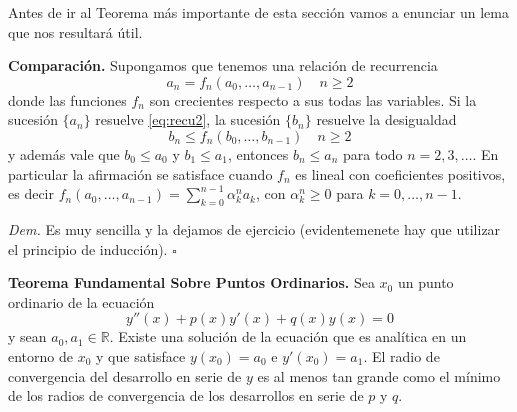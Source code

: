 \documentclass{article}
\newenvironment{demo}{\noindent\emph{Dem.}}{$\square$ \newline\vspace{5pt}}
\begin{document}
Antes de ir al Teorema más importante de esta sección vamos a enunciar un  lema que nos resultará útil.

\begin{lema}\label{lema:comp_recu}\textbf{Comparación.} Supongamos que tenemos una relación de recurrencia 
 \begin{equation}\label{eq:recu2} a_{n}=f_n(a_0,\ldots,a_{n-1})\quad n\geq 2\end{equation}
donde las funciones $f_n$ son crecientes respecto a sus todas las variables. Si la sucesión  $\{a_n\}$ resuelve \eqref{eq:recu2}, la sucesión  $\{b_n\}$ resuelve la desigualdad
 \[b_{n}\leq f_n(b_0,\ldots,b_{n-1})\quad n\geq 2 \]
y además vale que  $b_0\leq a_0$ y $b_1\leq a_1$, entonces $b_n\leq a_n$ para todo $n=2,3,\ldots$. En particular la afirmación se satisface cuando $f_n$ es lineal con coeficientes positivos, es decir $f_n(a_0,\ldots,a_{n-1})=\sum_{k=0}^{n-1}\alpha^n_ka_k$, con $\alpha^n_k\geq 0$ para $k=0,\ldots,n-1$.
\end{lema}
\begin{demo}
Es muy sencilla y la dejamos de ejercicio (evidentemenete hay que utilizar el principio de inducción). 
\end{demo}


\begin{teorema}\textbf{Teorema Fundamental Sobre Puntos Ordinarios.}\label{eq:teor_ptos_ord} Sea $x_0$ un punto ordinario de la ecuación
\[y''(x)+p(x)y'(x)+q(x)y(x)=0\]
y sean $a_0,a_1\in\mathbb{R}$. Existe una solución de la ecuación que es analítica en un entorno de $x_0$ y que satisface $y(x_0)=a_0$ e $y'(x_0)=a_1$. El radio de convergencia del desarrollo en serie de $y$ es al menos tan grande como el mínimo de los radios de convergencia de los desarrollos en serie de $p$ y $q$.
\end{teorema}
\end{document}
